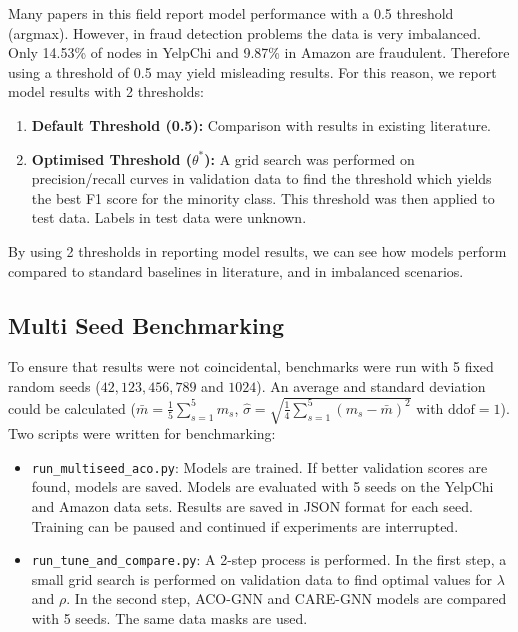 Many papers in this field report model performance with a 0.5 threshold (argmax). However, in fraud detection problems the data is very imbalanced. Only 14.53\% of nodes in YelpChi and 9.87\% in Amazon are fraudulent. Therefore using a threshold of 0.5 may yield misleading results. For this reason, we report model results with 2 thresholds:

\begin{enumerate}
    \item \textbf{Default Threshold (0.5):} Comparison with results in existing literature.
    \item \textbf{Optimised Threshold ($\theta^*$):} A grid search was performed on precision/recall curves in validation data to find the threshold which yields the best F1 score for the minority class. This threshold was then applied to test data. Labels in test data were unknown.
\end{enumerate}

By using 2 thresholds in reporting model results, we can see how models perform compared to standard baselines in literature, and in imbalanced scenarios.

\subsection{Multi Seed Benchmarking}
\label{subsec:multiseed_scripts}

To ensure that results were not coincidental, benchmarks were run with 5 fixed random seeds ($42, 123, 456, 789$ and $1024$). An average and standard deviation could be calculated ($\bar{m} = \frac{1}{5}\sum_{s=1}^{5} m_s$, $\hat{\sigma} = \sqrt{\frac{1}{4}\sum_{s=1}^{5}(m_s - \bar{m})^2}$ with $\text{ddof} = 1$). Two scripts were written for benchmarking:

\begin{itemize}
    \item \texttt{run\_multiseed\_aco.py}: Models are trained. If better validation scores are found, models are saved. Models are evaluated with 5 seeds on the YelpChi and Amazon data sets. Results are saved in JSON format for each seed. Training can be paused and continued if experiments are interrupted.
    \item \texttt{run\_tune\_and\_compare.py}: A 2-step process is performed. In the first step, a small grid search is performed on validation data to find optimal values for $\lambda$ and $\rho$. In the second step, ACO-GNN and CARE-GNN models are compared with 5 seeds. The same data masks are used.
\end{itemize}


